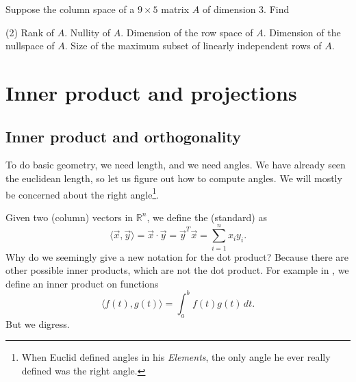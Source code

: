 \begin{exercise}
Suppose the column space of a $9 \times 5$ matrix $A$ of dimension 3.  Find
\begin{tasks}(2)
\task
Rank of $A$.
\task
Nullity of $A$.
\task
Dimension of the row space of $A$.
\task
Dimension of the nullspace of $A$.
\task
Size of the maximum subset of
linearly independent rows of $A$.
\end{tasks}
\end{exercise}


\sectionnewpage
\section{Inner product and projections}
\label{innerproduct:section}


\subsection{Inner product and orthogonality}

To do basic geometry, we need length, and we need angles.
We have already seen the euclidean length, so let us figure out how to
compute angles.  We will mostly be concerned
about the right angle\footnote{When Euclid defined angles in his
\emph{Elements}, the only angle he ever really defined was the right angle.}.

Given two (column) vectors in ${\mathbb{R}}^n$,
we define the (standard)
\emph{} as
\begin{equation*}
\langle \vec{x} , \vec{y} \rangle =
\vec{x} \cdot \vec{y}
=
\vec{y}^T \vec{x}
=
\sum_{i=1}^n x_i y_i .
\end{equation*}
Why do we seemingly give a new notation for the dot product?  
Because there are other possible inner products, which are not the dot product.
For example in , we define an inner product on
functions 
\begin{equation*}
\langle f(t) , g(t) \rangle =
\int_{a}^{b}
f(t) g(t) \, dt .
\end{equation*}
But we digress.

